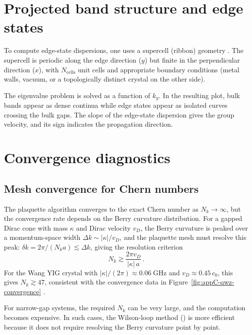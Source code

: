 \section{Projected band structure and edge states}
\label{sec:appC-projected}

To compute edge-state dispersions, one uses a supercell (ribbon)
geometry \cite{hafezi2013imaging}.  The supercell is periodic along the edge direction ($y$) but
finite in the perpendicular direction ($x$), with $N_{\mathrm{cells}}$
unit cells and appropriate boundary conditions (metal walls, vacuum, or
a topologically distinct crystal on the other side).

The eigenvalue problem is solved as a function of $k_y$.  In the
resulting plot, bulk bands appear as dense continua while edge states
appear as isolated curves crossing the bulk gaps.  The slope of the
edge-state dispersion gives the group velocity, and its sign indicates
the propagation direction.

\section{Convergence diagnostics}
\label{sec:appC-convergence-diagnostics}

\subsection{Mesh convergence for Chern numbers}
\label{sec:appC-mesh-convergence}

The plaquette algorithm converges to the exact Chern number as
$N_k\to\infty$, but the convergence rate depends on the Berry
curvature distribution.  For a gapped Dirac cone with mass $\kappa$
and Dirac velocity $v_D$, the Berry curvature is peaked over a
momentum-space width $\Delta k\sim|\kappa|/v_D$, and the plaquette
mesh must resolve this peak: $\delta k=2\pi/(N_k a)\lesssim\Delta k$,
giving the resolution criterion
\begin{equation}\label{eq:appC-resolution}
  N_k \gtrsim \frac{2\pi v_D}{|\kappa|\,a}\,.
\end{equation}
For the Wang YIG crystal with $|\kappa|/(2\pi)\approx 0.06\;\mathrm{GHz}$
and $v_D\approx 0.45\,c_0$, this gives $N_k\gtrsim 47$, consistent
with the convergence data in Figure~\ref{fig:appC-qwz-convergence}
\cite{ozawa2018topological}.

For narrow-gap systems, the required $N_k$ can be very large, and
the computation becomes expensive.  In such cases, the Wilson-loop
method () is more efficient because it does
not require resolving the Berry curvature point by point.

